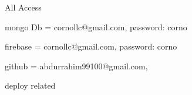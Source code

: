 All Access

mongo Db = cornollc@gmail.com, password: corno

firebase = cornollc@gmail.com, password: corno

github = abdurrahim99100@gmail.com, 

deploy related
